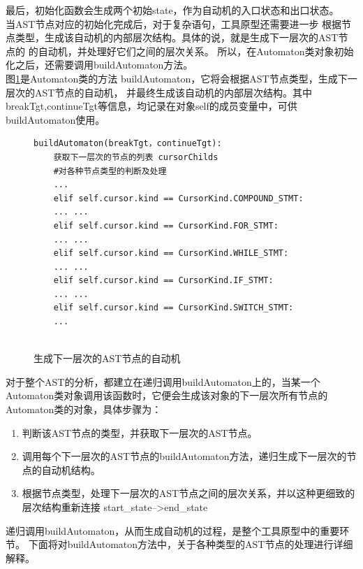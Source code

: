 最后，初始化函数会生成两个初始state，作为自动机的入口状态和出口状态。\\


当AST节点对应的初始化完成后，对于复杂语句，工具原型还需要进一步
根据节点类型，生成该自动机的内部层次结构。具体的说，就是生成下一层次的AST节点的
的自动机，并处理好它们之间的层次关系。
所以，在Automaton类对象初始化之后，还需要调用buildAutomaton方法。\\

图\ref{生成下一层次的AST节点的自动机}是Automaton类的方法 buildAutomaton，它将会根据AST节点类型，生成下一层次的AST节点的自动机，
并最终生成该自动机的内部层次结构。其中breakTgt,continueTgt等信息，均记录在对象self的成员变量中，可供buildAutomaton使用。
\\
\begin{figure}[ht]
\centering
\begin{minipage}{10cm}
\begin{lstlisting}
buildAutomaton(breakTgt，continueTgt): 
    获取下一层次的节点的列表 cursorChilds
    #对各种节点类型的判断及处理
    ...
    elif self.cursor.kind == CursorKind.COMPOUND_STMT:
    ... ...
    elif self.cursor.kind == CursorKind.FOR_STMT:
    ... ...
    elif self.cursor.kind == CursorKind.WHILE_STMT:
    ... ...
    elif self.cursor.kind == CursorKind.IF_STMT:
    ... ...
    elif self.cursor.kind == CursorKind.SWITCH_STMT:
    ...
    
\end{lstlisting}
\end{minipage}
\caption{生成下一层次的AST节点的自动机}
\label{生成下一层次的AST节点的自动机}
\end{figure}

对于整个AST的分析，都建立在递归调用buildAutomaton上的，当某一个Automaton类对象调用该函数时，它便会生成该对象的下一层次所有节点的Automaton类的对象，具体步骤为：
\begin{enumerate}
	\item 判断该AST节点的类型，并获取下一层次的AST节点。
	\item 调用每个下一层次的AST节点的buildAutomaton方法，递归生成下一层次的节点的自动机结构。
	\item 根据节点类型，处理下一层次的AST节点之间的层次关系，并以这种更细致的层次结构重新连接 start\_state-->end\_state

\end{enumerate}

递归调用buildAutomaton，从而生成自动机的过程，是整个工具原型中的重要环节。
下面将对buildAutomaton方法中，关于各种类型的AST节点的处理进行详细解释。

